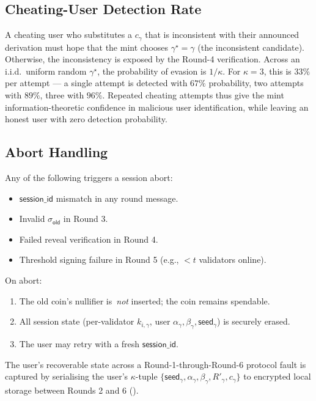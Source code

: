 \subsection{Cheating-User Detection Rate}
\label{sec:refresh-detection}

A cheating user who substitutes a $c_\gamma$ that is inconsistent with their announced derivation must hope that the mint chooses $\gamma^\star = \gamma$ (the inconsistent candidate). Otherwise, the inconsistency is exposed by the Round-4 verification. Across an i.i.d.~uniform random $\gamma^\star$, the probability of evasion is $1/\kappa$. For $\kappa = 3$, this is $33\%$ per attempt --- a single attempt is detected with $67\%$ probability, two attempts with $89\%$, three with $96\%$. Repeated cheating attempts thus give the mint information-theoretic confidence in malicious user identification, while leaving an honest user with zero detection probability.

\subsection{Abort Handling}
\label{sec:refresh-abort}

Any of the following triggers a session abort:
\begin{itemize}[leftmargin=2em,itemsep=0pt]
  \item $\mathsf{session\_id}$ mismatch in any round message.
  \item Invalid $\sigma_{\mathsf{old}}$ in Round 3.
  \item Failed reveal verification in Round 4.
  \item Threshold signing failure in Round 5 (e.g., $< t$ validators online).
\end{itemize}

On abort:
\begin{enumerate}[leftmargin=2em,itemsep=0pt]
  \item The old coin's nullifier is~\emph{not} inserted; the coin remains spendable.
  \item All session state (per-validator $k_{i,\gamma}$, user $\alpha_\gamma, \beta_\gamma, \mathsf{seed}_\gamma$) is securely erased.
  \item The user may retry with a fresh $\mathsf{session\_id}$.
\end{enumerate}

The user's recoverable state across a Round-1-through-Round-6 protocol fault is captured by serialising the user's $\kappa$-tuple $\{\mathsf{seed}_\gamma, \alpha_\gamma, \beta_\gamma, R'_\gamma, c_\gamma\}$ to encrypted local storage between Rounds 2 and 6 ().
